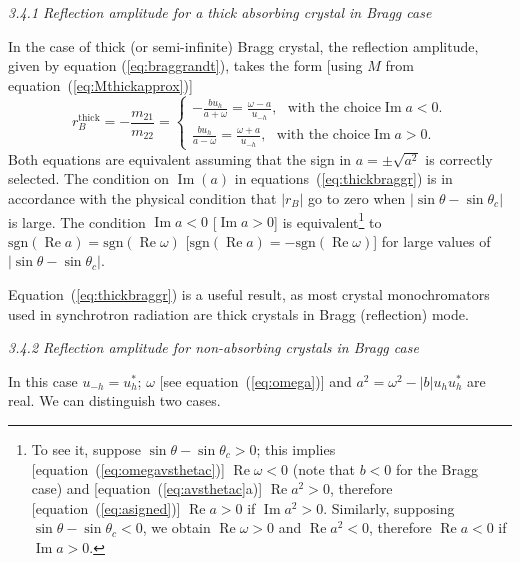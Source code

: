 \documentclass[preprint]{iucr}              %
\begin{document}
\textit{3.4.1  Reflection amplitude for a thick absorbing crystal in Bragg case}

In the case of thick (or semi-infinite) Bragg crystal, the reflection amplitude, given by equation (\ref{eq:braggrandt}), takes the form [using $M$ from equation~(\ref{eq:Mthickapprox})]
\begin{equation}\label{eq:thickbraggr}
    r_B^{\text{thick}} = -\frac{m_{21}}{m_{22}} =
    \begin{cases} 
    -\frac{b u_h}{a+\omega}=\frac{\omega-a}{u_{-h}}, ~~~ \text{with the choice} \operatorname{Im} a <0.
    \\
    \frac{b u_h}{a-\omega} = \frac{\omega+a}{u_{-h}}, ~~~ \text{with the choice} \operatorname{Im} a>0.
    \end{cases}
\end{equation}
Both equations are equivalent assuming that the sign in $a=\pm \sqrt{a^2}$ is correctly selected. The condition on $\operatorname{Im}(a)$ in equations~(\ref{eq:thickbraggr}) is in accordance with the physical condition that $|r_B|$ go to zero when $|\sin\theta-\sin\theta_c|$ is large.
The condition $\operatorname{Im} a < 0$ [$\operatorname{Im} a > 0$] is equivalent\footnote{
To see it, suppose $\sin\theta-\sin\theta_c>0$; this implies [equation~(\ref{eq:omegavsthetac})] $\operatorname{Re}\omega<0$ (note that $b<0$ for the Bragg case) and 
[equation~(\ref{eq:avsthetac}a)] $\operatorname{Re}a^2>0$, therefore [equation~(\ref{eq:asigned})] $\operatorname{Re}a>0$ if $\operatorname{Im}a^2>0$. 
Similarly, supposing $\sin\theta-\sin\theta_c<0$, we obtain $\operatorname{Re}\omega>0$ and $\operatorname{Re}a^2<0$, therefore $\operatorname{Re}a<0$ if $\operatorname{Im}a>0$. 
}
to $\text{sgn}(\operatorname{Re}a)=\text{sgn}(\operatorname{Re}\omega)$ [$\text{sgn}(\operatorname{Re}a)=-\text{sgn}(\operatorname{Re}\omega)$] for large values of $|\sin\theta-\sin\theta_c|$.
 
Equation~(\ref{eq:thickbraggr}) is a useful result, as most crystal monochromators used in synchrotron radiation are thick crystals in Bragg (reflection) mode. 


\textit{3.4.2  Reflection amplitude for non-absorbing crystals in Bragg case}

In this case $u_{-h}=u^*_h$; $\omega$ [see equation~(\ref{eq:omega})] and $a^2=\omega^2-|b| u_h u_{h}^*$ are real. We can distinguish two cases. 
\end{document}
